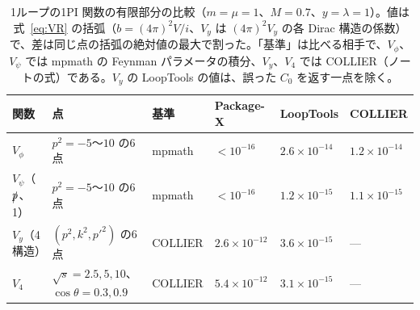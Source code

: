 \documentclass[a4paper,10pt]{ltjsarticle}
\begin{document}
\begin{table}[tbp]
\centering\small
\caption{1ループの1PI 関数の有限部分の比較（$m=\mu=1$、$M=0.7$、$y=\lambda=1$）。値は式~\eqref{eq:VR} の括弧（$b=(4\pi)^2V/i$、$V_y$ は $(4\pi)^2V_y$ の各 Dirac 構造の係数）で、差は同じ点の括弧の絶対値の最大で割った。「基準」は比べる相手で、$V_\phi$、$V_\psi$ では mpmath の Feynman パラメータの積分、$V_y$、$V_4$ では COLLIER（ノートの式）である。$V_y$ の LoopTools の値は、誤った $C_0$ を返す一点を除く。}
\label{tab:oneloop}
\begin{tabular}{llllll}
\toprule
関数 & 点 & 基準 & Package-X & LoopTools & COLLIER \\
\midrule
$V_\phi$ & $p^2=-5$〜$10$ の6点 & mpmath & $<10^{-16}$ & $2.6\times10^{-14}$ & $1.2\times10^{-14}$ \\
$V_\psi$（$\slashed p$、1） & $p^2=-5$〜$10$ の6点 & mpmath & $<10^{-16}$ & $1.2\times10^{-15}$ & $1.1\times10^{-15}$ \\
$V_y$（4構造） & $(p^2,k^2,p'^2)$ の6点 & COLLIER & $2.6\times10^{-12}$ & $3.6\times10^{-15}$ & — \\
$V_4$ & $\sqrt s=2.5,5,10$、$\cos\theta=0.3,0.9$ & COLLIER & $5.4\times10^{-12}$ & $3.1\times10^{-15}$ & — \\
\bottomrule
\end{tabular}
\end{table}
\end{document}
